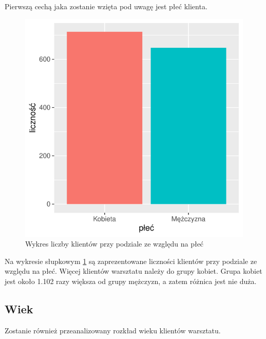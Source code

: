 \documentclass{article}\usepackage[]{graphicx}\usepackage[]{xcolor}
\makeatletter
\def\maxwidth{ %
  \ifdim\Gin@nat@width>\linewidth
    \linewidth
  \else
    \Gin@nat@width
  \fi
}
\newenvironment{knitrout}{}{} %
\makeatother
\begin{document}
Pierwszą cechą jaka zostanie wzięta pod uwagę jest płeć klienta.

\begin{knitrout}
\color{fgcolor}\begin{figure}

{\centering \includegraphics[width=\maxwidth]{figure/fig_plec-1} 

}

\caption[Wykres liczby klientów przy podziale ze względu na płeć]{Wykres liczby klientów przy podziale ze względu na płeć}\label{fig:fig_plec}
\end{figure}

\end{knitrout}

Na wykresie słupkowym \ref{fig:fig_plec} są zaprezentowane liczności klientów przy podziale ze względu na płeć. Więcej klientów warsztatu należy do grupy kobiet. Grupa kobiet jest około 1.102
razy większa od grupy mężczyzn, a zatem różnica jest nie duża.

\subsection{Wiek}

Zostanie również przeanalizowany rozkład wieku klientów warsztatu.
\end{document}
